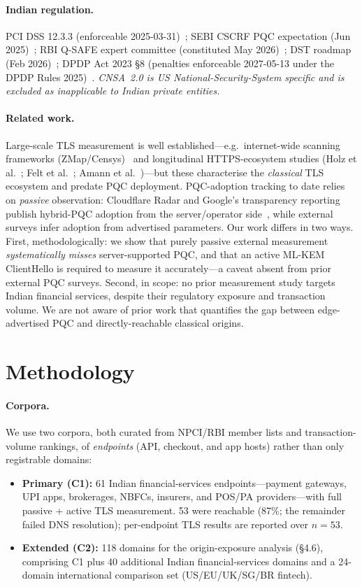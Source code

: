 \documentclass[11pt]{article}
\begin{document}
\paragraph{Indian regulation.} PCI DSS 12.3.3 (enforceable 2025-03-31)~\cite{pci}; SEBI CSCRF
PQC expectation (Jun 2025)~\cite{sebi}; RBI Q-SAFE expert committee (constituted May
2026)~\cite{rbi}; DST roadmap (Feb 2026)~\cite{dst}; DPDP Act 2023 \S8 (penalties enforceable
2027-05-13 under the DPDP Rules 2025)~\cite{dpdp}. \emph{CNSA~2.0 is US National-Security-System
specific and is excluded as inapplicable to Indian private entities.}

\paragraph{Related work.} Large-scale TLS measurement is well established---e.g.\ internet-wide
scanning frameworks (ZMap/Censys)~\cite{zmap} and longitudinal HTTPS-ecosystem studies (Holz et
al.~\cite{holz}; Felt et al.~\cite{felt}; Amann et al.~\cite{amann})---but these characterise the
\emph{classical} TLS ecosystem and predate PQC deployment. PQC-adoption tracking to date relies
on \emph{passive} observation: Cloudflare Radar and Google's transparency reporting publish
hybrid-PQC adoption from the server/operator side~\cite{cloudflare}, while external surveys infer
adoption from advertised parameters. Our work differs in two ways. First, methodologically: we
show that purely passive external measurement \emph{systematically misses} server-supported PQC,
and that an active ML-KEM ClientHello is required to measure it accurately---a caveat absent from
prior external PQC surveys. Second, in scope: no prior measurement study targets Indian financial
services, despite their regulatory exposure and transaction volume. We are not aware of prior work
that quantifies the gap between edge-advertised PQC and directly-reachable classical origins.

\section{Methodology}

\paragraph{Corpora.} We use two corpora, both curated from NPCI/RBI member lists and
transaction-volume rankings, of \emph{endpoints} (API, checkout, and app hosts) rather than only
registrable domains:
\begin{itemize}[leftmargin=1.4em,nosep]
  \item \textbf{Primary (C1):} 61 Indian financial-services endpoints---payment gateways, UPI
  apps, brokerages, NBFCs, insurers, and POS/PA providers---with full passive + active TLS
  measurement. 53 were reachable (87\%; the remainder failed DNS resolution); per-endpoint TLS
  results are reported over $n = 53$.
  \item \textbf{Extended (C2):} 118 domains for the origin-exposure analysis (\S4.6), comprising
  C1 plus 40 additional Indian financial-services domains and a 24-domain international comparison
  set (US/EU/UK/SG/BR fintech).
\end{itemize}
\end{document}
